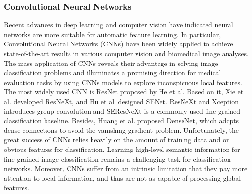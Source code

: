 \documentclass[journal]{IEEEtran}
\begin{document}
\subsubsection{Convolutional Neural Networks}
Recent advances in deep learning and computer vision have indicated neural networks are more suitable for automatic feature learning\cite{shen2017deep}. In particular, Convolutional Neural Networks (CNNs) have been widely applied to achieve state-of-the-art results in various computer vision and biomedical image analyses. The mass application of CNNs\cite{9362125,7930382,9316292} reveals their advantage in solving image classification problems and illuminates a promising direction for medical evaluation tasks by using CNNs models to explore inconspicuous local features. The most widely used CNN is ResNet proposed by He et al\cite{he2016deep}. Based on it, Xie et al. developed ResNeXt\cite{xie2017aggregated}, and Hu et al. designed SENet\cite{hu2018squeeze}. ResNeXt and Xception\cite{chollet2017xception} introduces group convolution and SEResNeXt is a commonly used fine-grained classification baseline. Besides, Huang et al.\cite{huang2017densely} proposed DenseNet, which adopts dense connections to avoid the vanishing gradient problem. Unfortunately, the great success of CNNs relies heavily on the amount of training data and on obvious features for classification. Learning high-level semantic information for fine-grained image classification remains a challenging task for classification networks. Moreover, CNNs suffer from an intrinsic limitation that they pay more attention to local information, and thus are not as capable of processing global features.
\end{document}
